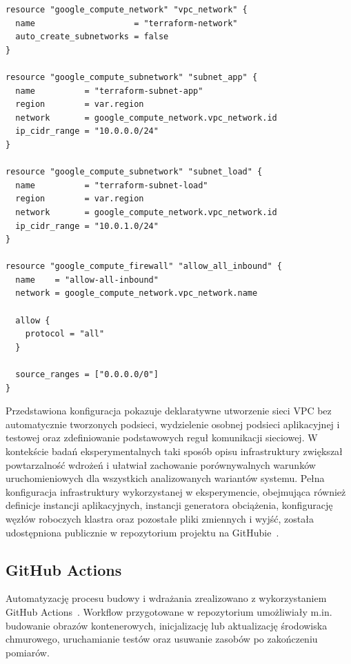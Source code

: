 \begin{listing}[H]
    \begin{verbatim}
resource "google_compute_network" "vpc_network" {
  name                    = "terraform-network"
  auto_create_subnetworks = false
}

resource "google_compute_subnetwork" "subnet_app" {
  name          = "terraform-subnet-app"
  region        = var.region
  network       = google_compute_network.vpc_network.id
  ip_cidr_range = "10.0.0.0/24"
}

resource "google_compute_subnetwork" "subnet_load" {
  name          = "terraform-subnet-load"
  region        = var.region
  network       = google_compute_network.vpc_network.id
  ip_cidr_range = "10.0.1.0/24"
}

resource "google_compute_firewall" "allow_all_inbound" {
  name    = "allow-all-inbound"
  network = google_compute_network.vpc_network.name

  allow {
    protocol = "all"
  }

  source_ranges = ["0.0.0.0/0"]
}
    \end{verbatim}
    \caption{Przykładowa konfiguracja Terraform definiująca sieć VPC, podsieci oraz reguły zapory}
    \label{lst:terraform-network-config}
\end{listing}

Przedstawiona konfiguracja pokazuje deklaratywne utworzenie sieci VPC bez automatycznie tworzonych podsieci, wydzielenie osobnej podsieci aplikacyjnej i testowej oraz zdefiniowanie podstawowych reguł komunikacji sieciowej. W kontekście badań eksperymentalnych taki sposób opisu infrastruktury zwiększał powtarzalność wdrożeń i ułatwiał zachowanie porównywalnych warunków uruchomieniowych dla wszystkich analizowanych wariantów systemu. Pełna konfiguracja infrastruktury wykorzystanej w eksperymencie, obejmująca również definicje instancji aplikacyjnych, instancji generatora obciążenia, konfigurację węzłów roboczych klastra oraz pozostałe pliki zmiennych i wyjść, została udostępniona publicznie w repozytorium projektu na GitHubie~\cite{repo_terraform}.

\subsection{GitHub Actions}

Automatyzację procesu budowy i wdrażania zrealizowano z wykorzystaniem GitHub Actions~\cite{githubactionsdocs}. Workflow przygotowane w repozytorium umożliwiały m.in. budowanie obrazów kontenerowych, inicjalizację lub aktualizację środowiska chmurowego, uruchamianie testów oraz usuwanie zasobów po zakończeniu pomiarów.

